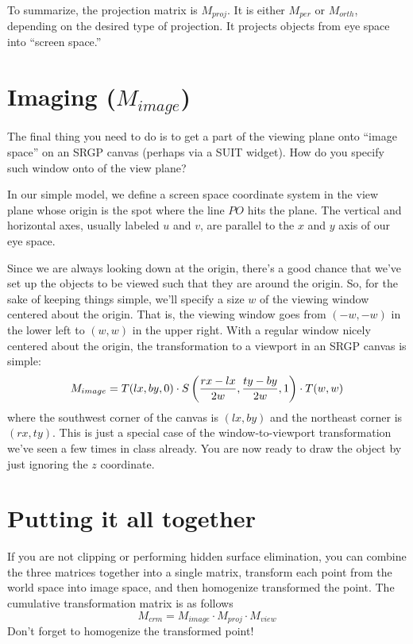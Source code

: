 To summarize, the projection matrix is $M_{proj}$. It is either 
$M_{per}$ or $M_{orth}$, depending on the desired type of projection. 
It projects objects from eye space into ``screen space.'' 


\section{ Imaging ($M_{image}$)}

The final thing you need to do is to get a part of the viewing plane onto
``image space'' on an SRGP canvas (perhaps via a SUIT widget).  How do you
specify such window onto of the view plane?

In our simple model, we define a screen space coordinate system in the view
plane whose origin is the spot where the line $PO$ hits the plane. The vertical
and horizontal axes, usually labeled $u$ and $v$, are parallel to the $x$ and
$y$ axis of our eye space.

Since we are always looking down at the origin, there's a good chance 
that we've set up the objects to be viewed such that they are around 
the origin. So, for the sake of keeping things simple, we'll specify 
a size $w$ of the viewing window centered about the origin. That 
is, the viewing window goes from $(-w,-w)$ in the lower left to $(w,w)$ 
in the upper right. With a regular window nicely centered about the 
origin, the transformation to a viewport in an SRGP canvas is simple:
\[
    M_{image} = 
        T(lx, by, 0) \cdot 
        S\left( {{rx-lx} \over {2w}}, {{ty-by} \over {2w}}, 1\right) \cdot 
        T(w,w)
\]
where the southwest corner of the canvas is $(lx,by)$ and
the northeast corner is $(rx,ty)$. This is just a special case of
the window-to-viewport transformation we've seen a few times in class already.
You are now ready to draw the object by just ignoring the $z$ coordinate.

\section{Putting it all together}

If you are not clipping or performing hidden surface elimination, 
you can combine the three matrices together into a single matrix, 
transform each point from the world space into image space, and then 
homogenize transformed the point. 
The cumulative transformation matrix is as follows
\[
    M_{crm} = M_{image} \cdot M_{proj} \cdot M_{view}
\]
Don't forget to homogenize the transformed  point! 


